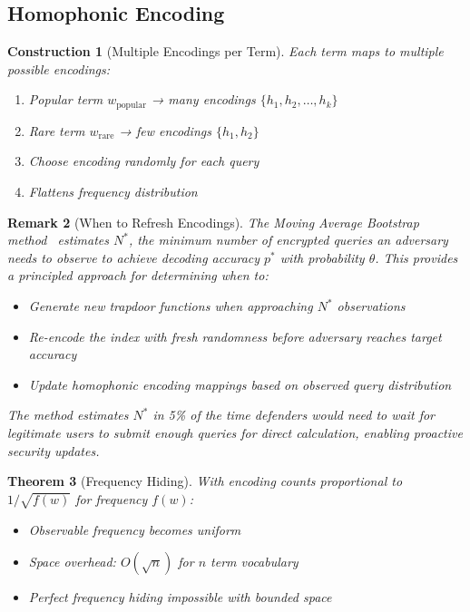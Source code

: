 \documentclass[11pt,final]{article}
\newtheorem{theorem}{Theorem}[section]
\newtheorem{remark}[theorem]{Remark}
\newtheorem{construction}[theorem]{Construction}
\begin{document}
\subsection{Homophonic Encoding}

\begin{construction}[Multiple Encodings per Term]
Each term maps to multiple possible encodings:
\begin{enumerate}
    \item Popular term $w_{\text{popular}}$ → many encodings $\{h_1, h_2, \ldots, h_k\}$
    \item Rare term $w_{\text{rare}}$ → few encodings $\{h_1, h_2\}$
    \item Choose encoding randomly for each query
    \item Flattens frequency distribution
\end{enumerate}
\end{construction}

\begin{remark}[When to Refresh Encodings]
The Moving Average Bootstrap method~\cite{towell2016estimating} estimates $N^*$, the minimum number of encrypted queries an adversary needs to observe to achieve decoding accuracy $p^*$ with probability $\theta$. This provides a principled approach for determining when to:
\begin{itemize}
    \item Generate new trapdoor functions when approaching $N^*$ observations
    \item Re-encode the index with fresh randomness before adversary reaches target accuracy
    \item Update homophonic encoding mappings based on observed query distribution
\end{itemize}
The method estimates $N^*$ in 5\% of the time defenders would need to wait for legitimate users to submit enough queries for direct calculation, enabling proactive security updates.
\end{remark}

\begin{theorem}[Frequency Hiding]
With encoding counts proportional to $1/\sqrt{f(w)}$ for frequency $f(w)$:
\begin{itemize}
    \item Observable frequency becomes uniform
    \item Space overhead: $O(\sqrt{n})$ for $n$ term vocabulary
    \item Perfect frequency hiding impossible with bounded space
\end{itemize}
\end{theorem}
\end{document}
